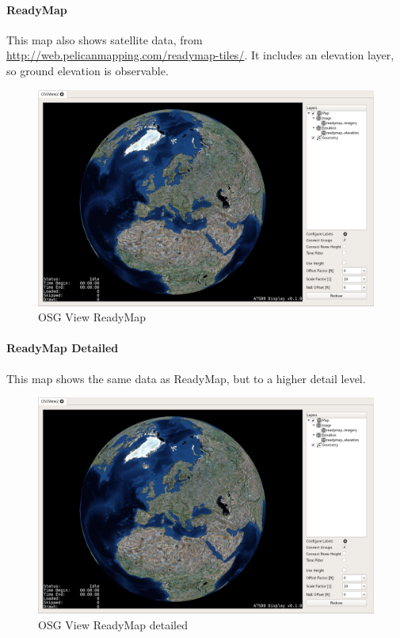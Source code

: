 {\newpage
\paragraph{ReadyMap}

This map also shows satellite data, from \url{http://web.pelicanmapping.com/readymap-tiles/}. It includes an elevation layer, so ground elevation is observable.

\begin{figure}[H]
    \hspace*{-2cm}
    \includegraphics[width=18cm,frame]{../screenshots/osgview_ready.png}
  \caption{OSG View ReadyMap}
\end{figure}


\paragraph{ReadyMap Detailed}

This map shows the same data as ReadyMap, but to a higher detail level.

\begin{figure}[H]
    \hspace*{-2cm}
    \includegraphics[width=18cm,frame]{../screenshots/osgview_ready_detail.png}
  \caption{OSG View ReadyMap detailed}
\end{figure}


}
